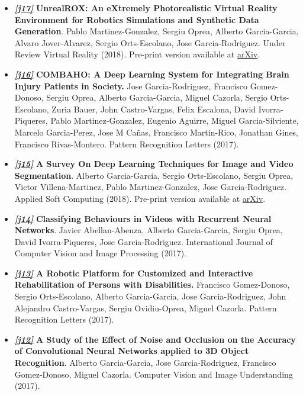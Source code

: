 \documentclass[8pt]{article}
\begin{document}
\begin{itemize}
    \item \emph{\textbf{\href{https://arxiv.org/abs/1810.06936}{[j17]}}} \textbf{UnrealROX: An eXtremely Photorealistic Virtual Reality Environment for Robotics Simulations and Synthetic Data Generation}. Pablo Martinez-Gonzalez, Sergiu Oprea, Alberto Garcia-Garcia, Alvaro Jover-Alvarez, Sergio Orts-Escolano, Jose Garcia-Rodriguez. Under Review Virtual Reality (2018). Pre-print version available at {\href{https://arxiv.org/abs/1810.06936}{arXiv}}.
    \item \emph{\textbf{\href{https://www.sciencedirect.com/science/article/pii/S0167865519300534}{[j16]}}} \textbf{COMBAHO: A Deep Learning System for Integrating Brain Injury Patients in Society.} Jose Garcia-Rodriguez, Francisco Gomez-Donoso, Sergiu Oprea, Alberto Garcia-Garcia, Miguel Cazorla, Sergio Orts-Escolano, Zuria Bauer, John Castro-Vargas, Felix Escalona, David Ivorra-Piqueres, Pablo Martinez-Gonzalez, Eugenio Aguirre, Miguel Garcia-Silviente, Marcelo Garcia-Perez, Jose M Cañas, Francisco Martin-Rico, Jonathan Gines, Francisco Rivas-Montero. Pattern Recognition Letters (2017).
    \item \emph{\textbf{\href{https://www.sciencedirect.com/science/article/pii/S1568494618302813}{[j15]}}} \textbf{A Survey On Deep Learning Techniques for Image and Video Segmentation}. Alberto Garcia-Garcia, Sergio Orts-Escolano, Sergiu Oprea, Victor Villena-Martinez, Pablo Martinez-Gonzalez, Jose Garcia-Rodriguez. Applied Soft Computing (2018). Pre-print version available at {\href{https://arxiv.org/abs/1704.06857}{arXiv}}.
    \item \emph{\textbf{\href{https://www.igi-global.com/article/classifying-behaviours-in-videos-with-recurrent-neural-networks/195006}{[j14]}}} \textbf{Classifying Behaviours in Videos with Recurrent Neural Networks}. Javier Abellan-Abenza, Alberto Garcia-Garcia, Sergiu Oprea, David Ivorra-Piqueres, Jose Garcia-Rodriguez. International Journal of Computer Vision and Image Processing (2017).
    \item \emph{\textbf{\href{http://www.sciencedirect.com/science/article/pii/S0167865517301903}{[j13]}}} \textbf{A Robotic Platform for Customized and Interactive Rehabilitation of Persons with Disabilities.} Francisco Gomez-Donoso, Sergio Orts-Escolano, Alberto Garcia-Garcia, Jose Garcia-Rodriguez, John Alejandro Castro-Vargas, Sergiu Ovidiu-Oprea, Miguel Cazorla. Pattern Recognition Letters (2017).
    \item \emph{\textbf{\href{http://www.sciencedirect.com/science/article/pii/S1077314217301182}{[j12]}}} \textbf{A Study of the Effect of Noise and Occlusion on the Accuracy of Convolutional Neural Networks applied to 3D Object Recognition}. Alberto Garcia-Garcia, Jose Garcia-Rodriguez, Francisco Gomez-Donoso, Miguel Cazorla. Computer Vision and Image Understanding (2017).

\end{itemize}
\end{document}
